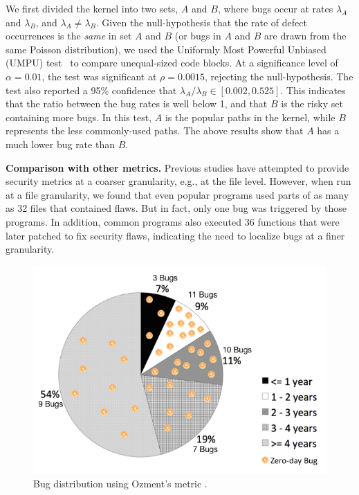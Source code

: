 We first divided the kernel into two sets,
$A$ and $B$, where bugs occur at rates $\lambda_A$ and
$\lambda_B$, and $\lambda_A \neq \lambda_B$. Given the null-hypothesis
that the rate of defect occurrences is the \textit{same} in set $A$ and $B$
(or bugs in $A$ and $B$ are drawn from the same Poisson distribution),
we used the Uniformly Most Powerful Unbiased (UMPU) test~\cite{shiue1982experiment}
to compare unequal-sized code blocks.
At a significance level of $\alpha=0.01$, the test was significant at
$\rho=0.0015$, rejecting the null-hypothesis.
The test also reported a 95\% confidence that $\lambda_A / \lambda_B
\in [0.002, 0.525]$. This indicates that the ratio between the bug rates is well
below 1, and that $B$ is the risky set containing more bugs.
In this test, $A$ is the popular paths in the kernel, while $B$
represents the less commonly-used paths. The above results show that
$A$ has a much lower bug rate than $B$.

\textbf{Comparison with other metrics.}
Previous studies have attempted to provide security metrics at a coarser granularity,
e.g., at the file level. However, when run at a file
granularity, we found that even popular programs used parts of as many as
32 files that contained flaws. But in fact, only one bug was triggered by those programs.
In addition, common programs also executed 36 functions that were later patched to fix security
flaws, indicating the need to localize bugs at a finer granularity.

\begin{figure}
\centering
\includegraphics[width=1.0\columnwidth]{diagram/metrics_age.png}
\caption{\small Bug distribution using Ozment's metric \cite{ozment2006milk}.}
\label{fig:metrics_age}
\end{figure}

